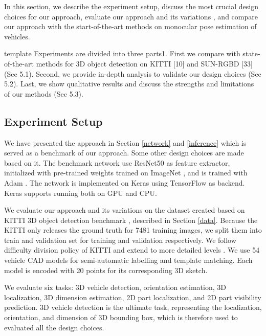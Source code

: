 In this section, we describe the experiment setup, discuss the most crucial design choices for our approach, evaluate our approach and its variations , and compare our approach with the start-of-the-art methods on monocular pose estimation of vehicles.  

template \tbd Experiments are divided into three parts1. First we compare with state-of-the-art methods for 3D object detection on KITTI [10] and SUN-RGBD [33] (Sec 5.1). Second, we provide in-depth analysis to validate our design choices (Sec 5.2). Last, we show qualitative results and discuss the strengths and limitations of our methods (Sec 5.3).
\subsection{Experiment Setup}

We have presented the approach in Section \ref{network} and \ref{inference} which is served as a benchmark of our approach. Some other design choices are made based on it. The benchmark network use ResNet50 \cite{DBLP:journals/corr/HeZRS15} as feature extractor, initialized with pre-trained weights trained on ImageNet \cite{DBLP:Russakovsky14}, and is trained with Adam \cite{DBLP:journals/corr/KingmaB14}. The network is implemented on Keras \cite{chollet2015keras} using TensorFlow \cite{tensorflow2015-whitepaper} as backend. Keras supports running both on GPU and CPU. 

We evaluate our approach and its variations on the dataset created based on KITTI 3D object detection benchmark \cite{Geiger2012CVPR}, described in Section \ref{data}. Because the KITTI only releases the ground truth for 7481 training images, we split them into train and validation set for training and validation respectively. We follow difficulty division policy of  KITTI and extend to more detailed levels \tbd. We use 54 vehicle CAD models \cite{NIPS2012_4562} for semi-automatic labelling and template matching. Each model is encoded with 20 points for its corresponding 3D sketch.

We evaluate six tasks: 3D vehicle detection, orientation estimation, 3D localization, 3D dimension estimation, 2D part localization, and 2D part visibility prediction. 3D vehicle detection is the ultimate task, representing the localization, orientation, and dimension of 3D bounding box,  which is therefore used to evaluated all the design choices.